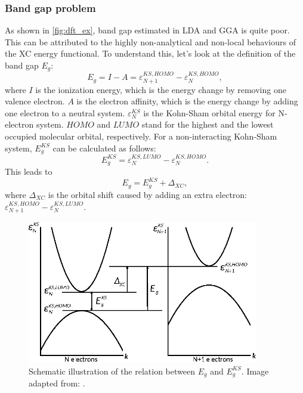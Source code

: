 \subsubsection{Band gap problem}
As shown in \autoref{fig:dft_ex}, band gap estimated in LDA and GGA is quite poor. This can be attributed to the highly non-analytical and non-local behaviours of the XC energy functional. To understand this, let's look at the definition of the band gap $E_{g}$:
\begin{equation}
E_{g}=I-A=\varepsilon_{N+1}^{KS,HOMO}-\varepsilon_N^{KS,HOMO},
\end{equation}
where $I$ is the ionization energy, which is the energy change by removing one valence electron. $A$ is the electron affinity, which is the energy change by adding one electron to a neutral system. $\varepsilon_N^{KS}$ is the Kohn-Sham orbital energy for N-electron system. $HOMO$ and $LUMO$ stand for the highest and the lowest occupied molecular orbital, respectively. For a non-interacting Kohn-Sham system, $E_{g}^{KS}$ can be calculated as follows:
\begin{equation}
E_{g}^{KS}=\varepsilon_{N}^{KS,LUMO}-\varepsilon_{N}^{KS,HOMO}.
\end{equation}
This leads to 
\begin{equation}
E_{g}=E_{g}^{KS}+\Delta_{XC},
\end{equation}
where $\Delta_{XC}$ is the orbital shift caused by adding an extra electron: $\varepsilon_{N+1}^{KS,HOMO}-\varepsilon_{N}^{KS,LUMO}$.
\begin{figure}[htbp!] 
\centering  
\includegraphics[width=0.9\textwidth]{Eg.eps}
\caption[Schematic illustration of the relation between $E_g$ and $E^{KS}_g$]{ Schematic illustration of the relation between $E_g$ and $E^{KS}_g$. Image adapted from: \cite{fiolhais2008primer}.}  
\label{fig:dft_eg}
\end{figure} 
